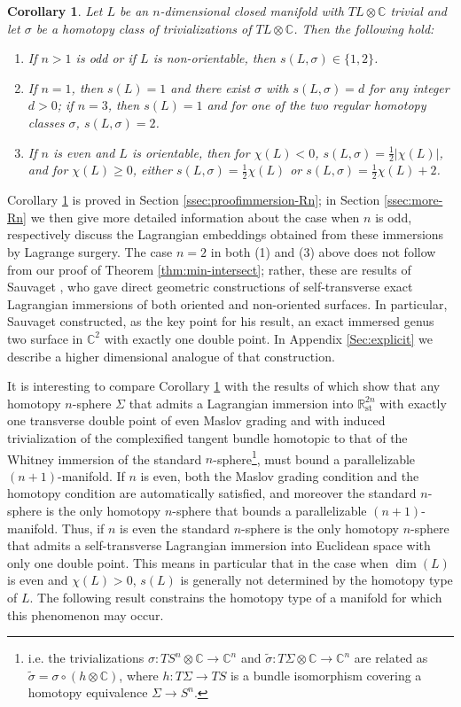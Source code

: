 \documentclass[reqno,11pt]{amsart}
\numberwithin{equation}{section}
\theoremstyle{my}
\theoremstyle{my}
\newtheorem{cor}[thm]{Corollary}
\theoremstyle{your}
\newcommand{\R}{\mathbb{R}}
\newcommand{\C}{\mathbb{C}}
\newcommand{\st}{\mathrm{st}}
\newcommand{\wt}{\widetilde}
\begin{document}
\begin{cor}\label{cor:immersion-Rn}
Let $L$ be an $n$-dimensional closed manifold with $TL\otimes\C$ trivial and let $\sigma$ be a homotopy class of trivializations of $TL\otimes\C$. Then the following hold:
\begin{enumerate}
\item  If $n>1$ is odd or if $L$ is non-orientable, then $s(L,\sigma) \in \{1,2\}$.
\item  If $n=1$, then $s(L)=1$ and there exist $\sigma$ with $s(L,\sigma)=d$ for any integer $d>0$; if $n=3$, then $s(L)=1$ and for one of the two regular homotopy classes $\sigma$, $s(L,\sigma)=2$. 
\item  If $n$ is even and $L$ is orientable, then for $\chi(L)<0$, $s(L,\sigma) = \frac{1}{2}|\chi(L)|$, and for
$\chi(L)\geq  0$, either $s(L,\sigma) = \frac{1}{2}\chi(L)$ or $s(L,\sigma) = \frac{1}{2}\chi(L)+2$.
\end{enumerate}
\end{cor}

Corollary \ref{cor:immersion-Rn} is proved in Section \ref{ssec:proofimmersion-Rn}; in Section  \ref{ssec:more-Rn} we  then give more detailed information about the case when $n$ is odd, respectively discuss the Lagrangian embeddings obtained from these immersions by  Lagrange surgery. The case $n=2$ in both (1) and (3) above does not follow from our proof of Theorem \ref{thm:min-intersect}; rather, these are results of Sauvaget \cite{Sauvaget}, who gave direct geometric constructions of self-transverse exact Lagrangian immersions of both oriented and non-oriented surfaces. In particular, Sauvaget constructed, as the key point for his result, an exact immersed genus two surface in $\C^2$ with exactly one double point. In Appendix \ref{Sec:explicit} we describe a higher dimensional analogue of that construction. 

It is interesting to  compare Corollary \ref{cor:immersion-Rn} with the results of \cite{ES1,ES2} which show that any homotopy $n$-sphere $\Sigma$ that admits a Lagrangian immersion into $\R^{2n}_{\st}$ with exactly one transverse double point of even Maslov grading and with induced trivialization of the complexified tangent bundle homotopic to that of the Whitney immersion of the standard $n$-sphere\footnote{i.e. the trivializations $\sigma\colon T S^n \otimes\C\to\C^n$ and $\wt\sigma\colon T \Sigma \otimes\C\to\C^n$ are related as
$\wt\sigma=\sigma\circ( h\otimes \C)$, where $h\colon T\Sigma\to TS$ is a bundle isomorphism covering a homotopy equivalence $\Sigma\to S^n$.}, must bound a parallelizable $(n+1)$-manifold. If $n$ is even, both the Maslov grading condition and the homotopy condition are automatically satisfied, and moreover the standard $n$-sphere is the only homotopy $n$-sphere that bounds a parallelizable $(n+1)$-manifold. Thus, if $n$ is even the standard $n$-sphere is the only homotopy $n$-sphere that admits a self-transverse Lagrangian immersion into Euclidean space with only one double point. This means in particular that in the case when $\dim(L)$ is even and $\chi(L)>0$, $s(L)$ is generally not determined by the homotopy type of $L$.  The following result constrains the homotopy type of a manifold for which this phenomenon may occur.
\end{document}
